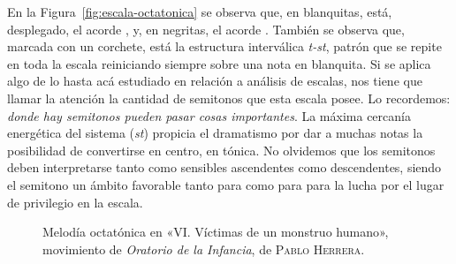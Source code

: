 \documentclass[a4paper,11pt]{article}
\begin{document}
\begin{multicols}{2}
En la Figura~\ref{fig:escala-octatonica} se observa que, en blanquitas, está, desplegado, el acorde , y, en negritas, el acorde \hbox{.} También se observa que, marcada con un corchete, está la estructura interválica \emph{t-st}, patrón que se repite en toda la escala reiniciando siempre sobre una nota en blanquita. Si se aplica algo de lo hasta acá estudiado en relación a análisis de escalas, nos tiene que llamar la atención la cantidad de semitonos que esta escala posee. Lo recordemos: \emph{donde hay semitonos pueden pasar cosas importantes}. La máxima cercanía energética del sistema (\emph{st}) propicia el dramatismo por dar a muchas notas la posibilidad de convertirse en centro, en tónica. No olvidemos que los semitonos deben interpretarse tanto como sensibles ascendentes como descendentes, siendo el semitono  un ámbito favorable tanto para  como para  para la lucha por el lugar de privilegio en la escala.
\end{multicols}

\begin{figure}[ht]
\centering
{}
\caption{Melodía octatónica en «VI. Víctimas de un monstruo humano», movimiento de \emph{Oratorio de la Infancia}, de \textsc{Pablo Herrera}.}\label{fig:melodia-octatonica}
\end{figure}
\end{document}
